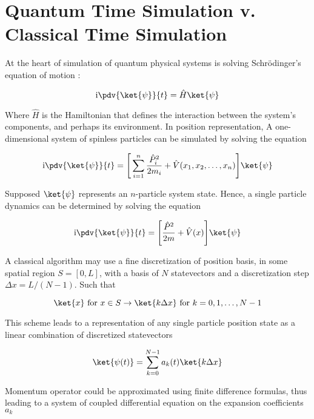\section{Quantum Time Simulation v. Classical Time Simulation}

  At the heart of simulation of quantum physical systems is solving Schrödinger's equation of motion \cite{Beck, Nielsen}:

  \begin{equation}
  \mathrm{i}
  \label{eq:SchEqn}\pdv{\ket{\psi}}{t} = \hat{H} \ket{\psi}
  \end{equation}

  Where $\hat{H}$ is the Hamiltonian that defines the interaction between the system's components, and perhaps its environment. In position representation, A one-dimensional system of spinless particles can be simulated by solving the equation

  \begin{equation}
  \mathrm{i}\pdv{\ket{\psi}}{t} = \Bigg[\sum_{i = 1}^{n} \frac{\hat{P}_i^2}{2m_i} + \hat{V}(x_1, x_2, \ldots, x_n)\Bigg] \ket{\psi}
  \end{equation}

  Supposed $\ket{\psi}$ represents an $n$-particle system state. Hence, a single particle dynamics can be determined by solving the equation

  \begin{equation}
  \mathrm{i}\pdv{\ket{\psi}}{t} = \Bigg[\frac{\hat{P}^2}{2m} + \hat{V}(x)\Bigg] \ket{\psi}
  \end{equation}

  A classical algorithm may use a fine discretization of position basis, in some spatial region $\mathit{S} = [0,L]$, with a basis of $N$ statevectors and a discretization step $\Delta x = L/(N-1)$. Such that

  \begin{equation}
    \ket{x} \text{ for } x \in S \rightarrow \ket{k \Delta x} \text{ for } k = 0,1,\ldots,N-1
  \end{equation}

  This scheme leads to a representation of any single particle position state as a linear combination of discretized statevectors

  \begin{equation}
    \ket{\psi(t)} = \sum_{k = 0}^{N-1} a_k(t) \ket{k \Delta x}
  \end{equation}

  Momentum operator could be approximated using finite difference formulas, thus leading to a system of coupled differential equation on the expansion coefficients $a_k$

